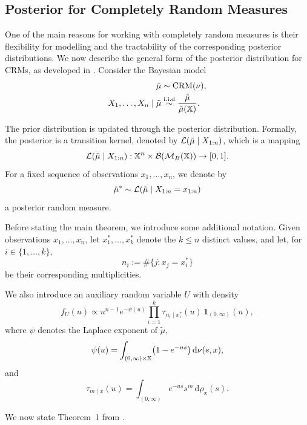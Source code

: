 \subsection{Posterior for Completely Random Measures}\label{subsection:bnp_toolbox_posterior_crm}

One of the main reasons for working with completely random measures is their flexibility for modelling and the tractability of the corresponding posterior distributions. We now describe the general form of the posterior distribution for CRMs, as developed in \cite{james2009posterior}. Consider the Bayesian model
\begin{equation}\label{model:bayesian_model_crm}
\begin{aligned}
    \tilde{\mu} &\sim \mathrm{CRM}(\nu), \\
    X_1,\dots, X_n \mid \tilde{\mu} &\overset{\mathrm{i.i.d}}{\sim} \frac{\tilde{\mu}}{\tilde{\mu}(\mathbb{X})}.
\end{aligned}
\end{equation}

The prior distribution is updated through the posterior distribution. Formally, the posterior is a transition kernel, denoted by $\mathcal{L}(\tilde{\mu}\mid X_{1:n})$, which is a mapping
\[
\mathcal{L}(\tilde{\mu}\mid X_{1:n}) : \mathbb{X}^n \times \mathcal{B}(\mathcal{M}_B(\mathbb{X})) \to [0,1].
\]
For a fixed sequence of observations $x_1,\dots,x_n$, we denote by
\[
\tilde{\mu}^* \sim \mathcal{L}(\tilde{\mu}\mid X_{1:n} = x_{1:n})
\]
a posterior random measure.

Before stating the main theorem, we introduce some additional notation. Given observations $x_1,\dots,x_n$, let $x_1^*,\dots,x_k^*$ denote the $k \leq n$ distinct values, and let, for $i \in \{1, \dots, k \}$,
\[
n_i := \#\{j : x_j = x_i^*\}
\]
be their corresponding multiplicities.

We also introduce an auxiliary random variable $U$ with density 
\[
f_U(u) \propto u^{n-1} e^{-\psi(u)} \prod_{i=1}^k \tau_{n_i \mid x_i^*}(u)\,\mathbf{1}_{(0,\infty)}(u),
\]
where $\psi$ denotes the Laplace exponent of $\tilde{\mu}$,
\[
\psi(u) = \int_{(0,\infty)\times \mathbb{X}} \bigl(1 - e^{-us}\bigr)\,\mathrm{d}\nu(s,x),
\]
and
\[
\tau_{m \mid x}(u) = \int_{(0,\infty)} e^{-us} s^m \,\mathrm{d}\rho_x(s).
\]

We now state Theorem~1 from \cite{james2009posterior}.

